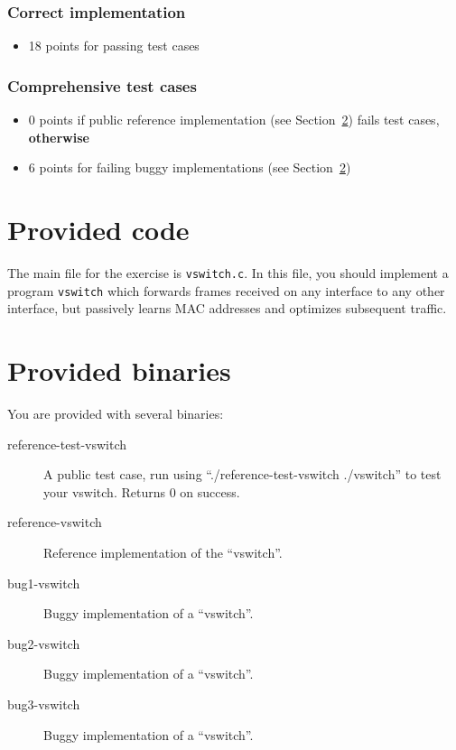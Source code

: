 \documentclass{article}
\begin{document}
\subsubsection{Correct implementation}
\begin{itemize}
  \item 18 points for passing test cases
\end{itemize}

\subsubsection{Comprehensive test cases}
\begin{itemize}
\item 0 points if public reference implementation (see Section~\ref{sec:binaries})
      fails test cases, {\bf otherwise}
\item 6 points for failing buggy implementations (see Section~\ref{sec:binaries})
\end{itemize}





\section{Provided code}



The main file for the exercise is {\tt vswitch.c}. In this file, you should
implement a program {\tt vswitch} which forwards frames received on any
interface to any other interface, but passively learns MAC addresses
and optimizes subsequent traffic.


\section{Provided binaries} \label{sec:binaries}

You are provided with several binaries:

\begin{description}
\item[reference-test-vswitch] A public test case, run using ``./reference-test-vswitch ./vswitch''
  to test your vswitch. Returns 0 on success.
\item[reference-vswitch] Reference implementation of the ``vswitch''.
\item[bug1-vswitch] Buggy implementation of a ``vswitch''.
\item[bug2-vswitch] Buggy implementation of a ``vswitch''.
\item[bug3-vswitch] Buggy implementation of a ``vswitch''.
\end{description}
\end{document}

